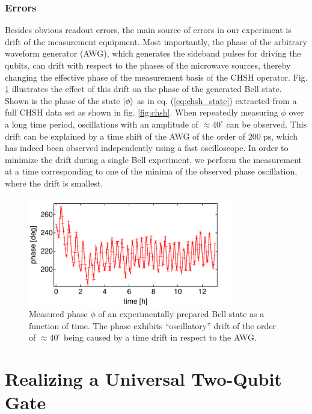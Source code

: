 \subsubsection{Errors} 

Besides obvious readout errors, the main source of errors in our experiment is drift of the measurement equipment. Most importantly, the phase of the arbitrary waveform generator (AWG), which generates the sideband pulses for driving the qubits, can drift with respect to the phases of the microwave sources, thereby changing the effective phase of the measurement basis of the CHSH operator. Fig. \ref{fig:chsh_drift} illustrates the effect of this drift on the phase of the generated Bell state. Shown is the phase of the state $\left| \phi \right>$ as in eq. (\ref{eq:chsh_state}) extracted from a full CHSH data set as shown in fig. \ref{fig:chsh}. When repeatedly measuring $\phi$ over a long time period, oscillations with an amplitude of $\approx 40^\circ$ can be observed. This drift can be explained by a time shift of the AWG of the order of $200\;\mathrm{ps}$, which has indeed been observed independently using a fast oscilloscope. In order to minimize the drift during a single Bell experiment, we perform the measurement at a time corresponding to one of the minima of the observed phase oscillation, where the drift is smallest.

\begin{figure}
	\centering
	\includegraphics[width=9cm]{"./data/ct5/2011_03_17 - chsh/chsh_drift"}
	\caption[]{Measured phase $\phi$ of an experimentally prepared Bell state as a function of time. The phase exhibits ``oscillatory'' drift of the order of $\approx 40^\circ$ being caused by a time drift in respect to the AWG.}
	\label{fig:chsh_drift}
\end{figure}

\section{Realizing a Universal Two-Qubit Gate}

